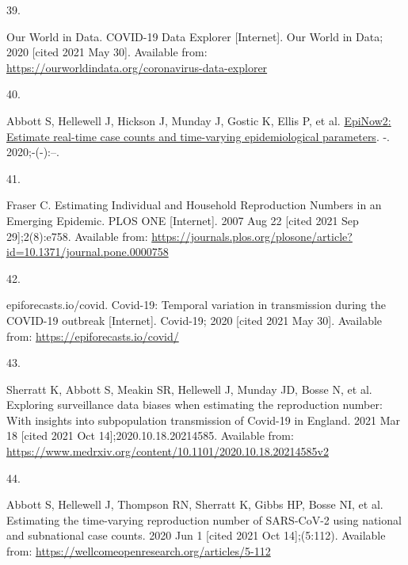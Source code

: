 \documentclass[
]{article}
\newlength{\cslhangindent}
\newlength{\csllabelwidth}
\newlength{\cslentryspacingunit} %
\newenvironment{CSLReferences}[2] %
 {%
  \setlength{\parindent}{0pt}
  \ifodd #1
  \let\oldpar\par
  \def\par{\hangindent=\cslhangindent\oldpar}
  \fi
  \setlength{\parskip}{#2\cslentryspacingunit}
 }%
 {}
\newcommand{\CSLLeftMargin}[1]{\parbox[t]{\csllabelwidth}{#1}}
\newcommand{\CSLRightInline}[1]{\parbox[t]{\linewidth - \csllabelwidth}{#1}\break}
\providecommand{\DIFaddbegin}{} %
\providecommand{\DIFaddend}{} %
\providecommand{\DIFdelbegin}{} %
\providecommand{\DIFdelend}{} %
\newcommand{\DIFscaledelfig}{0.5}
\newlength{\DIFdelgraphicswidth} %
\newlength{\DIFdelgraphicsheight} %
\newcommand{\DIFaddincludegraphics}[2][]{{\color{blue}\fbox{\DIFOincludegraphics[#1]{#2}}}} %
\newcommand{\DIFdelincludegraphics}[2][]{%
\sbox{\DIFdelgraphicsbox}{\DIFOincludegraphics[#1]{#2}}%
\settoboxwidth{\DIFdelgraphicswidth}{\DIFdelgraphicsbox} %
\settoboxtotalheight{\DIFdelgraphicsheight}{\DIFdelgraphicsbox} %
\scalebox{\DIFscaledelfig}{%
\parbox[b]{\DIFdelgraphicswidth}{\usebox{\DIFdelgraphicsbox}\\[-\baselineskip] \rule{\DIFdelgraphicswidth}{0em}}\llap{\resizebox{\DIFdelgraphicswidth}{\DIFdelgraphicsheight}{%
\setlength{\unitlength}{\DIFdelgraphicswidth}%
\begin{picture}(1,1)%
\thicklines\linethickness{2pt} %
{\color[rgb]{1,0,0}\put(0,0){\framebox(1,1){}}}%
{\color[rgb]{1,0,0}\put(0,0){\line( 1,1){1}}}%
{\color[rgb]{1,0,0}\put(0,1){\line(1,-1){1}}}%
\end{picture}%
}\hspace*{3pt}}} %
} %
\DeclareRobustCommand{\DIFaddbegin}{\DIFOaddbegin \let\includegraphics\DIFaddincludegraphics} %
\DeclareRobustCommand{\DIFaddend}{\DIFOaddend \let\includegraphics\DIFOincludegraphics} %
\DeclareRobustCommand{\DIFdelbegin}{\DIFOdelbegin \let\includegraphics\DIFdelincludegraphics} %
\DeclareRobustCommand{\DIFdelend}{\DIFOaddend \let\includegraphics\DIFOincludegraphics} %
\begin{document}
\begin{CSLReferences}{0}{0}
\leavevmode{}%
\CSLLeftMargin{39. }
\CSLRightInline{Our World in Data. {COVID-19 Data Explorer} {[}Internet{]}. {Our World in Data}; 2020 {[}cited 2021 May 30{]}. Available from: \url{https://ourworldindata.org/coronavirus-data-explorer}}

\leavevmode{}%
\CSLLeftMargin{40. }
\DIFdelbegin %
\DIFdelend \DIFaddbegin \CSLRightInline{Abbott S, Hellewell J, Hickson J, Munday J, Gostic K, Ellis P, et al. \href{https://doi.org/10.5281/zenodo.3957489}{EpiNow2: Estimate real-time case counts and time-varying epidemiological parameters}. -. 2020;-(-):--. }
\DIFaddend 

\leavevmode{}%
\CSLLeftMargin{41. }
\CSLRightInline{Fraser C. Estimating {Individual} and {Household Reproduction Numbers} in an {Emerging Epidemic}. PLOS ONE {[}Internet{]}. 2007 Aug 22 {[}cited 2021 Sep 29{]};2(8):e758. Available from: \url{https://journals.plos.org/plosone/article?id=10.1371/journal.pone.0000758}}

\leavevmode{}%
\CSLLeftMargin{42. }
\CSLRightInline{epiforecasts.io/covid. Covid-19: {Temporal} variation in transmission during the {COVID-19} outbreak {[}Internet{]}. {Covid-19}; 2020 {[}cited 2021 May 30{]}. Available from: \url{https://epiforecasts.io/covid/}}

\leavevmode{}%
\CSLLeftMargin{43. }
\CSLRightInline{Sherratt K, Abbott S, Meakin SR, Hellewell J, Munday JD, Bosse N, et al. Exploring surveillance data biases when estimating the reproduction number: With insights into subpopulation transmission of {Covid-19} in {England}. 2021 Mar 18 {[}cited 2021 Oct 14{]};2020.10.18.20214585. Available from: \url{https://www.medrxiv.org/content/10.1101/2020.10.18.20214585v2}}

\leavevmode{}%
\CSLLeftMargin{44. }
\CSLRightInline{Abbott S, Hellewell J, Thompson RN, Sherratt K, Gibbs HP, Bosse NI, et al. Estimating the time-varying reproduction number of {SARS-CoV-2} using national and subnational case counts. 2020 Jun 1 {[}cited 2021 Oct 14{]};(5:112). Available from: \url{https://wellcomeopenresearch.org/articles/5-112}}


\end{CSLReferences}
\end{document}
